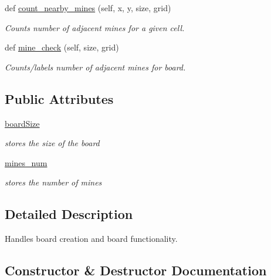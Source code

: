 \begin{DoxyCompactItemize}
def \mbox{\hyperlink{classboard_1_1_board_a5c3af1ac10d0ab67cdb6dc929dee2ae8}{count\+\_\+nearby\+\_\+mines}} (self, x, y, size, grid)
\begin{DoxyCompactList}\small\item\em Counts number of adjacent mines for a given cell. \end{DoxyCompactList}\item 
def \mbox{\hyperlink{classboard_1_1_board_a1cc112df5b8cc81867534d79f4f7d3a5}{mine\+\_\+check}} (self, size, grid)
\begin{DoxyCompactList}\small\item\em Counts/labels number of adjacent mines for board. \end{DoxyCompactList}\end{DoxyCompactItemize}
\subsection*{Public Attributes}
\begin{DoxyCompactItemize}
\item 
\mbox{\label{classboard_1_1_board_a2befa1b6aafb04a8e62ed9c39ae6b484}} 
\mbox{\hyperlink{classboard_1_1_board_a2befa1b6aafb04a8e62ed9c39ae6b484}{board\+Size}}
\begin{DoxyCompactList}\small\item\em stores the size of the board \end{DoxyCompactList}\item 
\mbox{\label{classboard_1_1_board_a580321d9c2710c6d1c64e1ad6ac5badf}} 
\mbox{\hyperlink{classboard_1_1_board_a580321d9c2710c6d1c64e1ad6ac5badf}{mines\+\_\+num}}
\begin{DoxyCompactList}\small\item\em stores the number of mines \end{DoxyCompactList}\end{DoxyCompactItemize}


\subsection{Detailed Description}
Handles board creation and board functionality. 

\subsection{Constructor \& Destructor Documentation}
\mbox{\label{classboard_1_1_board_a35203bbf9b43a84ecfea81eb7cbe66fd}} 
